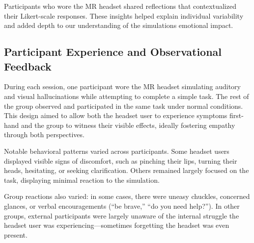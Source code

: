 Participants who wore the MR headset shared reflections that contextualized their Likert-scale responses. These insights helped explain individual variability and added depth to our understanding of the simulations emotional impact.


\subsection{Participant Experience and Observational Feedback}

During each session, one participant wore the MR headset simulating auditory and visual hallucinations while attempting to complete a simple task. The rest of the group observed and participated in the same task under normal conditions. This design aimed to allow both the headset user to experience symptoms first-hand and the group to witness their visible effects, ideally fostering empathy through both perspectives.

Notable behavioral patterns varied across participants. Some headset users displayed visible signs of discomfort, such as pinching their lips, turning their heads, hesitating, or seeking clarification. Others remained largely focused on the task, displaying minimal reaction to the simulation.

Group reactions also varied: in some cases, there were uneasy chuckles, concerned glances, or verbal encouragements (“be brave,” “do you need help?”). In other groups, external participants were largely unaware of the internal struggle the headset user was experiencing—sometimes forgetting the headset was even present.


